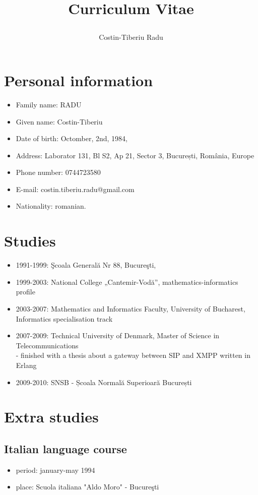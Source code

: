 \documentclass[a4paper,12pt,openany]{article}
\title{\begin{huge}Curriculum Vitae\end{huge}}
\author{\begin{large}Costin-Tiberiu Radu\end{large}}
\begin{document}
\maketitle
\section{Personal information}
	\begin{itemize}
 		\item Family name:	RADU
		\item Given name:	Costin-Tiberiu
		\item Date of birth:	Octomber, 2nd, 1984,
		\item Address:		Laborator 131, Bl S2, Ap 21, Sector 3, București, România, Europe
		\item Phone number:	0744723580
		\item E-mail:		costin.tiberiu.radu@gmail.com
		\item Nationality:	romanian. 
	\end{itemize}

\section{Studies}
	\begin{itemize}
	 	\item 1991-1999: Şcoala Generală Nr 88, Bucureşti,
		\item 1999-2003: National College „Cantemir-Vodă”, mathematics-informatics profile
		\item 2003-2007: Mathematics and Informatics Faculty, University of Bucharest, Informatics specialisation track
		\item 2007-2009: Technical University of Denmark, Master of Science in Telecommunications \\
			- finished with a thesis about a gateway between SIP and XMPP written in Erlang
		\item 2009-2010: SNSB - Școala Normală Superioară București
	\end{itemize}

\section{Extra studies}
	\subsection{Italian language course}
		\begin{itemize}
		 	\item period: january-may 1994
			\item place: Scuola italiana "Aldo Moro" - Bucureşti
		\end{itemize}
\end{document}
